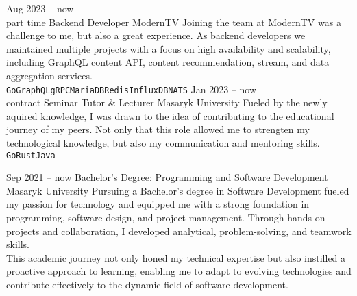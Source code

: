 \documentclass[9pt]{cv}
\begin{document}
\begin{center}
\end{center}


\begin{entrylist}
	\entry
		{Aug 2023 -- now\\\footnotesize{part time}}
		{Backend Developer}
		{ModernTV}
		{Joining the team at ModernTV was a challenge to me, but also a great experience. As backend developers we maintained multiple projects with a focus on high availability and scalability, including GraphQL content API, content recommendation, stream, and data aggregation services.\\ \texttt{Go}\slashsep\texttt{GraphQL}\slashsep\texttt{gRPC}\slashsep\texttt{MariaDB}\slashsep\texttt{Redis}\slashsep\texttt{InfluxDB}\slashsep\texttt{NATS}}
	\entry
		{Jan 2023 -- now\\\footnotesize{contract}}
        {Seminar Tutor \& Lecturer}
		{Masaryk University}
		{Fueled by the newly aquired knowledge, I was drawn to the idea of contributing to the educational journey of my peers. Not only that this role allowed me to strengten my technological knowledge, but also my communication and mentoring skills.\\ \texttt{Go}\slashsep\texttt{Rust}\slashsep\texttt{Java}}
\end{entrylist}


\begin{entrylist}
	\entry
		{Sep 2021 -- now}
		{Bachelor's Degree: Programming and Software Development}
		{Masaryk University}
		{Pursuing a Bachelor's degree in Software Development fueled my passion for technology and equipped me with a strong foundation in programming, software design, and project management. Through hands-on projects and collaboration, I developed analytical, problem-solving, and teamwork skills.\\ This academic journey not only honed my technical expertise but also instilled a proactive approach to learning, enabling me to adapt to evolving technologies and contribute effectively to the dynamic field of software development.}
\end{entrylist}
\end{document}
